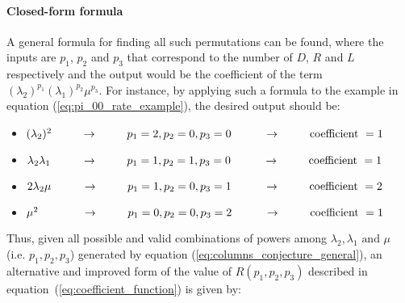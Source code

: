 \paragraph{Closed-form formula}
A general formula for finding all such permutations can be found, where the 
inputs are \( p_1\), \(p_2\) and \(p_3\) that correspond to the number of \(D\),
\(R\) and \(L\) respectively and the output would be the coefficient of the term 
\((\lambda_2)^{p_1} (\lambda_1)^{p_2} \mu^{p_3}\). 
For instance, by applying such a formula to the example in equation 
(\ref{eq:pi_00_rate_example}), the desired output should be:

\begin{itemize}
    \item \((\lambda_2)^2 \hspace{0.9cm} \rightarrow \hspace{0.9cm} 
    p_1 = 2, p_2=0, p_3=0 \hspace{1cm} \rightarrow \hspace{0.9cm} 
    \text{coefficient } = 1\)
    \item \(\lambda_2 \lambda_1 \hspace{0.95cm} \rightarrow \hspace{0.9cm} 
    p_1 = 1, p_2=1, p_3=0 \hspace{1cm} \rightarrow \hspace{0.9cm} 
    \text{coefficient } = 1\)
    \item \(2 \lambda_2 \mu \hspace{0.95cm} \rightarrow \hspace{0.9cm}
     p_1 = 1, p_2=0, p_3=1 \hspace{1cm} \rightarrow \hspace{0.9cm} 
     \text{coefficient } = 2\)
    \item \(\mu^2 \hspace{1.35cm} \rightarrow \hspace{0.9cm} 
    p_1=0, p_2=0, p_3=2 \hspace{1cm} \rightarrow \hspace{0.9cm} 
    \text{coefficient } = 1\)
\end{itemize}

Thus, given all possible and valid combinations of powers among \(\lambda_2, 
\lambda_1 \text{ and } \mu\) (i.e. \(p_1,p_2,p_3\)) generated by equation 
(\ref{eq:columns_conjecture_general}), an alternative and improved form of the 
value of \(R(p_1, p_2, p_3)\) described in
equation~(\ref{eq:coefficient_function}) is given by:

